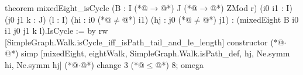 theorem mixedEight_isCycle (B : I (*@$\to$@*) J (*@$\to$@*) ZMod r) (i0 i1 : I) (j0 j1 k : J) (l : I)
    (hi : i0 (*@$\ne$@*) i1) (hj : j0 (*@$\ne$@*) j1) : (mixedEight B i0 i1 j0 j1 k l).IsCycle := by
  rw [SimpleGraph.Walk.isCycle_iff_isPath_tail_and_le_length]
  constructor
  (*@$\cdot$@*) simp [mixedEight, eightWalk, SimpleGraph.Walk.isPath_def, hj, Ne.symm hi, Ne.symm hj]
  (*@$\cdot$@*) change 3 (*@$\le$@*) 8; omega

